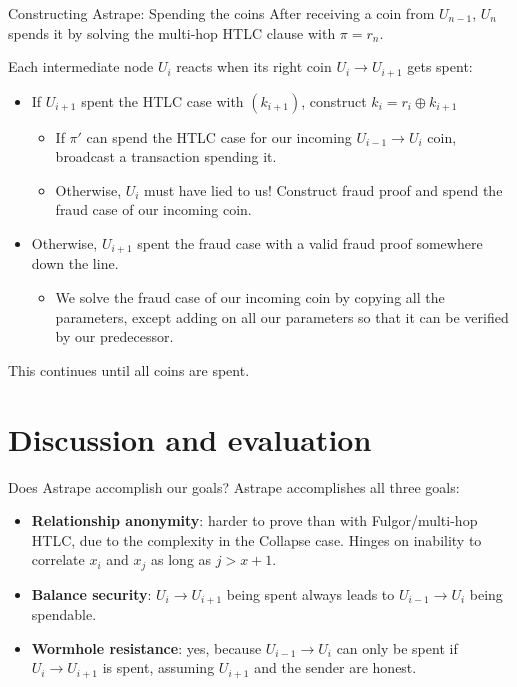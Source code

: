 \documentclass[aspectratio=169]{beamer}
\begin{document}
\begin{frame}{Constructing Astrape: Spending the coins}
    After receiving a coin from $U_{n-1}$, $U_n$ spends it by solving the multi-hop HTLC clause with $\pi=r_n$.

    Each intermediate node $U_i$ reacts when its right coin $U_i \rightarrow U_{i+1}$ gets spent:
    \begin{itemize}
        \item If $U_{i+1}$ spent the HTLC case with $(k_{i+1})$, construct $k_i = r_i \oplus k_{i+1}$
              \begin{itemize}
                  \item If $\pi'$ can spend the HTLC case for our incoming $U_{i-1} \rightarrow U_i$ coin, broadcast a transaction spending it.
                  \item Otherwise, $U_i$ must have lied to us! Construct fraud proof and spend the fraud case of our incoming coin.
              \end{itemize}
        \item Otherwise, $U_{i+1}$ spent the fraud case with a valid fraud proof somewhere down the line.
              \begin{itemize}
                  \item We solve the fraud case of our incoming coin by copying all the parameters, except adding on all our parameters so that it can be verified by our predecessor.
              \end{itemize}
    \end{itemize}

    This continues until all coins are spent.
\end{frame}


\section{Discussion and evaluation}

\begin{frame}{Does Astrape accomplish our goals?}
    Astrape accomplishes all three goals:
    \begin{itemize}
        \item \textbf{Relationship anonymity}: harder to prove than with Fulgor/multi-hop HTLC, due to the complexity in the Collapse case. Hinges on inability to correlate $x_i$ and $x_j$ as long as $j > x + 1$.
        \item \textbf{Balance security}: $U_i \rightarrow U_{i+1}$ being spent always leads to $U_{i-1} \rightarrow U_i$ being spendable.
        \item \textbf{Wormhole resistance}: yes, because $U_{i-1} \rightarrow U_i$ can only be spent if $U_i \rightarrow U_{i+1}$ is spent, assuming $U_{i+1}$ and the sender are honest.
    \end{itemize}
\end{frame}
\end{document}
